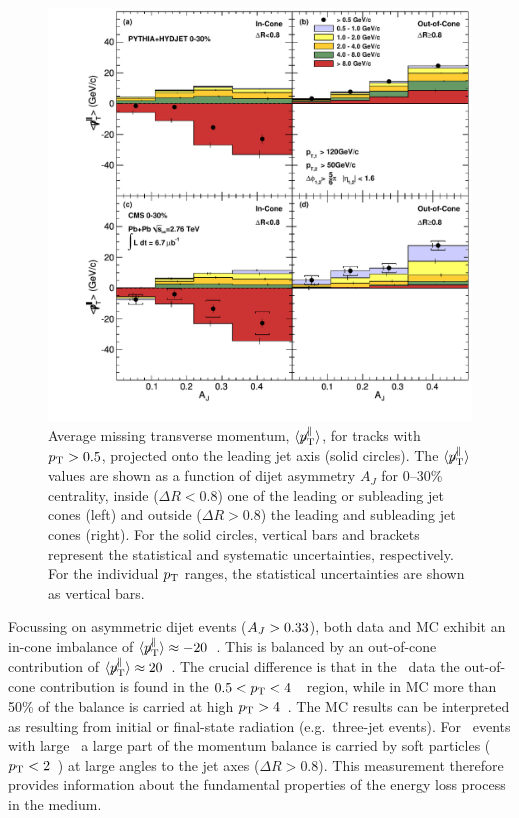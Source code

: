 \begin{figure}[!h]
\begin{center}
\includegraphics[width=0.98\mboxwidth]{jetfigures/missingPtParallel-Corrected-data-InConeOutConeDPhiCut_ntv6_2.pdf}
\caption{Average missing transverse momentum,
$\langle \displaystyle{\not} p_{\mathrm{T}}^{\parallel} \rangle$,
for tracks with $\mbox{$p_{\mathrm{T}}$} > 0.5$\GeVc, projected onto the leading jet axis (solid circles).
The $\langle \displaystyle{\not} p_{\mathrm{T}}^{\parallel} \rangle$ values are 
shown as a function of dijet asymmetry
$A_J$ for 0--30\% centrality, inside ($\Delta R < 0.8$) one of the leading or subleading jet cones (left) and
outside ($\Delta R > 0.8$) the leading and subleading jet cones (right).
For the solid circles, vertical bars and brackets represent
the statistical and systematic uncertainties, respectively.
For the individual $\mbox{$p_{\mathrm{T}}$}$ ranges, the statistical uncertainties are shown as vertical bars. }
\label{fig:GR:CMS_missingpT}
\end{center}
\end{figure}

Focussing on asymmetric dijet events ($A_J > 0.33$), both data and MC exhibit an
 in-cone imbalance of $\langle \displaystyle{\not} p_{\mathrm{T}}^{\parallel} \rangle \approx
-20$~\GeVc. This is balanced by an out-of-cone contribution of
$\langle \displaystyle{\not} p_{\mathrm{T}}^{\parallel} \rangle \approx 20$~\GeVc. The crucial 
difference is that in the \PbPb\ data the out-of-cone contribution is found in the $0.5 < \mbox{$p_{\mathrm{T}}$} < 4$~\GeVc\ region, 
while in MC more than 50\% of the balance is carried at high $\mbox{$p_{\mathrm{T}}$} > 4$~\GeVc. The MC 
results can be interpreted as resulting from initial or final-state radiation (e.g.\ three-jet events).
For \PbPb\ events with large \AJ\ a large part of the momentum balance is 
carried by soft particles ($\mbox{$p_{\mathrm{T}}$} < 2$~\GeVc) at large angles to the jet axes ($\Delta R > 0.8$). This measurement
therefore provides information about the fundamental properties of the energy loss process 
in the medium.

